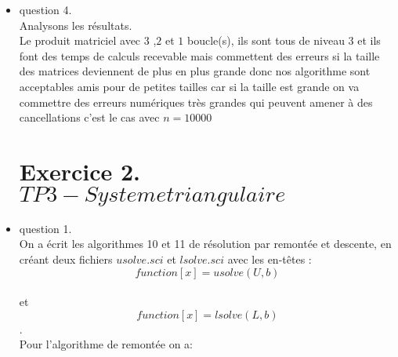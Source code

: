 \documentclass[]{article}
\begin{document}
\begin{itemize}
\begin{itemize}
\begin{itemize}
\item{question 4.\\}
Analysons les résultats.\\
Le produit matriciel avec $3$ ,$2$ et $1$ boucle(s), ils sont tous de niveau $3$ et ils font des temps de calculs recevable mais commettent des erreurs si la taille des matrices deviennent de plus en plus grande donc nos algorithme sont acceptables amis pour de petites tailles car si la taille est grande on va commettre des erreurs numériques très grandes qui peuvent amener à des cancellations c'est le cas avec $n=10000$
\\


\section{Exercice 2. $TP3 - Systeme  triangulaire$}

\item{question 1.\\}
On a écrit les algorithmes 10 et 11 de résolution par remontée et descente, en créant deux fichiers $usolve.sci$ et $lsolve.sci$ avec les en-têtes :\\
$$function [x] = usolve(U,b)$$\\
et\\
$$function [x] = lsolve(L,b)$$.\\
Pour l'algorithme de remontée on a:\\


\end{itemize}
\end{itemize}
\end{itemize}
\end{document}
